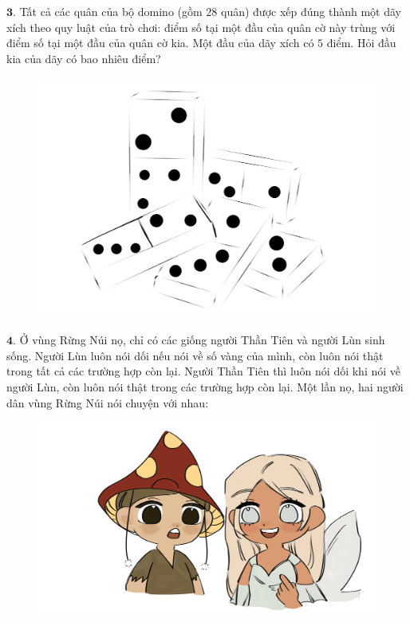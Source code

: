 \begin{multicols}{2}
\begin{figure}[H]
			\vspace*{-5pt}
		\end{figure}
	$\pmb{3.}$ 	Tất cả các quân của bộ domino (gồm $28$ quân) được xếp đúng thành một dãy xích theo quy luật của trò chơi: điểm số tại một đầu của quân cờ này trùng với điểm số tại một đầu của quân cờ kia. Một đầu của dãy xích có $5$ điểm. Hỏi đầu kia của dãy có bao nhiêu điểm?
	\begin{figure}[H]
			\centering
			\vspace*{-5pt}
			\captionsetup{labelformat= empty, justification=centering}
			\includegraphics[width=0.9\linewidth]{b3}
			\vspace*{-20pt}
	\end{figure}
	$\pmb{4.}$ Ở vùng Rừng Núi nọ, chỉ có các giống người Thần Tiên và người Lùn sinh sống. Người Lùn luôn nói dối nếu nói về số vàng của mình, còn luôn nói thật trong tất cả các trường hợp còn lại. Người Thần Tiên thì luôn nói dối khi nói về người Lùn, còn luôn nói thật trong các trường hợp còn lại. Một lần nọ, hai người dân vùng Rừng Núi nói chuyện với nhau:
	\begin{figure}[H]
		\centering
		\vspace*{-5pt}
		\captionsetup{labelformat= empty, justification=centering}
		\includegraphics[width=0.9\linewidth]{b4}

\end{figure}
\end{multicols}
